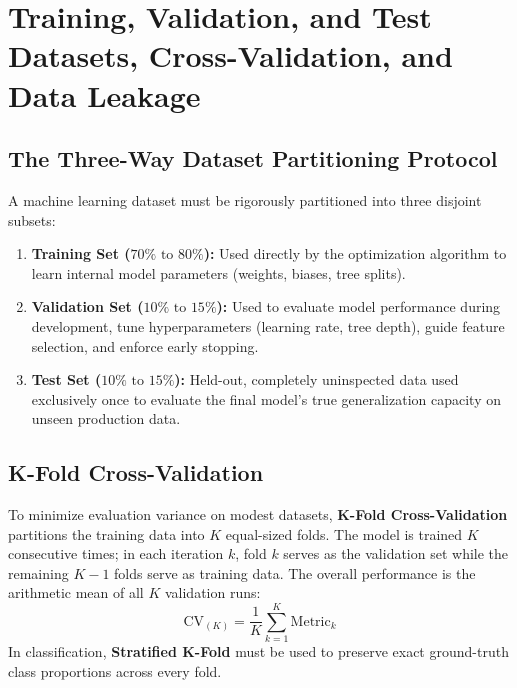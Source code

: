 \section{Training, Validation, and Test Datasets, Cross-Validation, and Data Leakage}
\label{sec:dataset_splitting_leakage}

\subsection{The Three-Way Dataset Partitioning Protocol}
A machine learning dataset must be rigorously partitioned into three disjoint subsets:
\begin{enumerate}
    \item \textbf{Training Set ($70\%\text{ to }80\%$):} Used directly by the optimization algorithm to learn internal model parameters (weights, biases, tree splits).
    \item \textbf{Validation Set ($10\%\text{ to }15\%$):} Used to evaluate model performance during development, tune hyperparameters (learning rate, tree depth), guide feature selection, and enforce early stopping.
    \item \textbf{Test Set ($10\%\text{ to }15\%$):} Held-out, completely uninspected data used exclusively once to evaluate the final model's true generalization capacity on unseen production data.
\end{enumerate}

\subsection{K-Fold Cross-Validation}
To minimize evaluation variance on modest datasets, \textbf{K-Fold Cross-Validation} partitions the training data into $K$ equal-sized folds. The model is trained $K$ consecutive times; in each iteration $k$, fold $k$ serves as the validation set while the remaining $K-1$ folds serve as training data. The overall performance is the arithmetic mean of all $K$ validation runs:
\begin{equation}
\text{CV}_{(K)} = \frac{1}{K} \sum_{k=1}^K \text{Metric}_k
\end{equation}
In classification, \textbf{Stratified K-Fold} must be used to preserve exact ground-truth class proportions across every fold.

